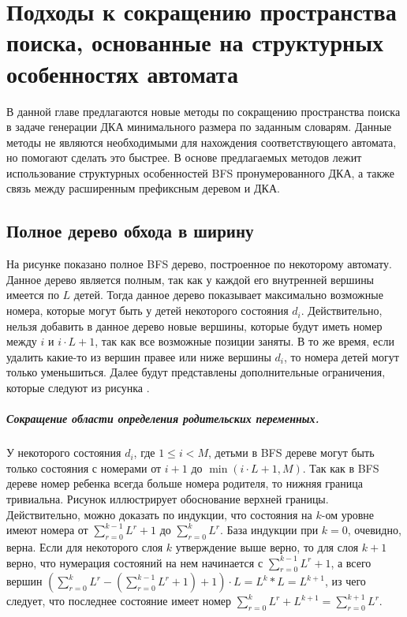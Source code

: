 
\chapter{Подходы к сокращению пространства поиска, основанные на структурных особенностях автомата} 
\label{sec:pruning}

В данной главе предлагаются новые методы по сокращению пространства поиска в задаче генерации ДКА минимального размера по заданным словарям. 
Данные методы не являются необходимыми для нахождения соответствующего автомата, но помогают сделать это быстрее.
В основе предлагаемых методов лежит использование структурных особенностей BFS пронумерованного ДКА, а также связь между расширенным префиксным деревом и ДКА.

\section{Полное дерево обхода в ширину}
\label{sec:pruning:bfs-tree}


На рисунке  показано полное BFS дерево, построенное по некоторому автомату.
Данное дерево является полным, так как у каждой его внутренней вершины имеется по $L$ детей.
Тогда данное дерево показывает максимально возможные номера, которые могут быть у детей некоторого состояния $d_{i}$.
Действительно, нельзя добавить в данное дерево новые вершины, которые будут иметь номер между $i$ и $i \cdot L + 1$, так как все возможные позиции заняты.
В то же время, если удалить какие-то из вершин правее или ниже вершины $d_{i}$, то номера детей могут только уменьшиться.
Далее будут представлены дополнительные ограничения, которые следуют из рисунка .

\paragraph{Сокращение области определения родительских переменных.}
У некоторого состояния $d_{i}$, где $1 \leq i < M$, детьми в BFS дереве могут быть только состояния с номерами от $i + 1$ до $\min\left(i \cdot L + 1, M\right)$.
Так как в BFS дереве номер ребенка всегда больше номера родителя, то нижняя граница тривиальна.
Рисунок  иллюстрирует обоснование верхней границы.
Действительно, можно доказать по индукции, что состояния на $k$-ом уровне имеют номера от $\sum_{r = 0}^{k - 1}L^{r} + 1$ до $\sum_{r = 0}^{k}L^{r}$.
База индукции при $k = 0$, очевидно, верна.
Если для некоторого слоя $k$ утверждение выше верно, то для слоя $k + 1$ верно, что нумерация состояний на нем начинается с $\sum_{r = 0}^{k - 1}L^{r} + 1$, а всего вершин $\left(\sum_{r = 0}^{k}L^{r} - \left(\sum_{r = 0}^{k - 1}L^{r} + 1\right) + 1\right) \cdot L = L^{k} * L = L^{k + 1}$, из чего следует, что последнее состояние имеет номер $\sum_{r = 0}^{k}L^{r} + L^{k + 1} = \sum_{r = 0}^{k + 1}L^{r}$.

